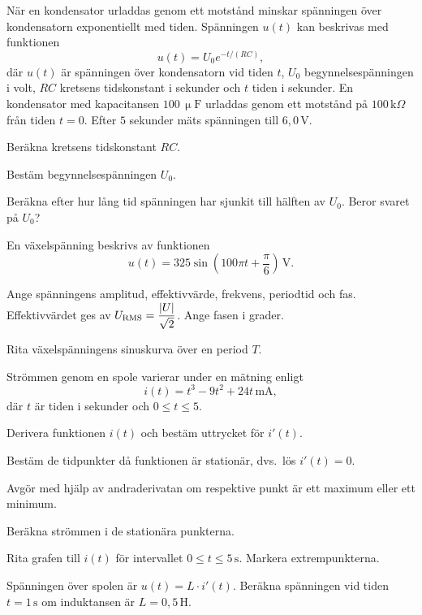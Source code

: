 När en kondensator urladdas genom ett motstånd minskar spänningen över kondensatorn exponentiellt
med tiden. Spänningen $u(t)$ kan beskrivas med funktionen
\[
  u(t) = U_0 e^{-t/(RC)},
\]
där $u(t)$ är spänningen över kondensatorn vid tiden $t$, $U_0$ begynnelsespänningen i volt, $RC$
kretsens tidskonstant i sekunder och $t$ tiden i sekunder. En kondensator med kapacitansen
$100\,\upmu\text{F}$ urladdas genom ett motstånd på $100\,\text{k}\Omega$ från tiden $t = 0$.
Efter $5$ sekunder mäts spänningen till $6{,}0\,\text{V}$.
\begin{parts}
  \item Beräkna kretsens tidskonstant $RC$.
  \item Bestäm begynnelsespänningen $U_0$.
  \item Beräkna efter hur lång tid spänningen har sjunkit till hälften av $U_0$. Beror svaret på
    $U_0$?
\end{parts}

En växelspänning beskrivs av funktionen
\[
  u(t) = 325\sin\left(100\pi t + \frac{\pi}{6}\right)\,\text{V}.
\]
\begin{parts}
  \item Ange spänningens amplitud, effektivvärde, frekvens, periodtid och fas. Effektivvärdet ges
    av $U_{\text{RMS}} = \dfrac{\lvert U\rvert}{\sqrt{2}}$. Ange fasen i grader.
  \item Rita växelspänningens sinuskurva över en period $T$.
\end{parts}

Strömmen genom en spole varierar under en mätning enligt
\[
  i(t) = t^3 - 9t^2 + 24t\,\text{mA},
\]
där $t$ är tiden i sekunder och $0 \leq t \leq 5$.
\begin{parts}
  \item Derivera funktionen $i(t)$ och bestäm uttrycket för $i'(t)$.
  \item Bestäm de tidpunkter då funktionen är stationär, dvs.\ lös $i'(t) = 0$.
  \item Avgör med hjälp av andraderivatan om respektive punkt är ett maximum eller ett minimum.
  \item Beräkna strömmen i de stationära punkterna.
  \item Rita grafen till $i(t)$ för intervallet $0 \leq t \leq 5\,\text{s}$. Markera
    extrempunkterna.
  \item Spänningen över spolen är $u(t) = L \cdot i'(t)$. Beräkna spänningen vid tiden
    $t = 1\,\text{s}$ om induktansen är $L = 0{,}5\,\text{H}$.
\end{parts}

